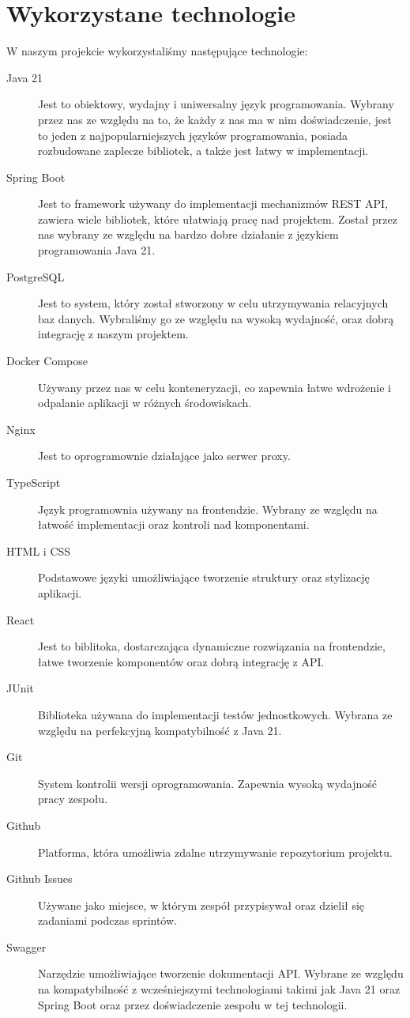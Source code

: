 \section{Wykorzystane technologie}
W naszym projekcie wykorzystaliśmy następujące technologie:
\begin{description}
    \item[Java 21] Jest to obiektowy, wydajny i uniwersalny język programowania. Wybrany przez nas ze względu na to, że każdy z nas ma w nim doświadczenie, jest to jeden z najpopularniejszych języków programowania, posiada rozbudowane zaplecze bibliotek, a także jest łatwy w implementacji.
    \item[Spring Boot] Jest to framework używany do implementacji mechanizmów REST API, zawiera wiele bibliotek, które ułatwiają pracę nad projektem. Został przez nas wybrany ze względu na bardzo dobre działanie z językiem programowania Java 21.
    \item[PostgreSQL] Jest to system, który został stworzony w celu utrzymywania relacyjnych baz danych. Wybraliśmy go ze względu na wysoką wydajność, oraz dobrą integrację z naszym projektem.
    \item[Docker Compose] Używany przez nas w celu konteneryzacji, co zapewnia łatwe wdrożenie i odpalanie aplikacji w różnych środowiskach.
    \item[Nginx] Jest to oprogramownie działające jako serwer proxy.
    \item[TypeScript] Język programownia używany na frontendzie. Wybrany ze względu na łatwość implementacji oraz kontroli nad komponentami.
    \item[HTML i CSS] Podstawowe języki umożliwiające tworzenie struktury oraz stylizację aplikacji.
    \item[React] Jest to biblitoka, dostarczająca dynamiczne rozwiązania na frontendzie, łatwe tworzenie komponentów oraz dobrą integrację z API.
    \item[JUnit] Biblioteka używana do implementacji testów jednostkowych. Wybrana ze względu na perfekcyjną kompatybilność z Java 21.
    \item[Git] System kontrolii wersji oprogramowania. Zapewnia wysoką wydajność pracy zespołu.
    \item[Github] Platforma, która umożliwia zdalne utrzymywanie repozytorium projektu.
    \item[Github Issues] Używane jako miejsce, w którym zespół przypisywał oraz dzielił się zadaniami podczas sprintów.
    \item[Swagger] Narzędzie umożliwiające tworzenie dokumentacji API. Wybrane ze względu na kompatybilność z wcześniejszymi technologiami takimi jak Java 21 oraz Spring Boot oraz przez doświadczenie zespołu w tej technologii.

\end{description}
